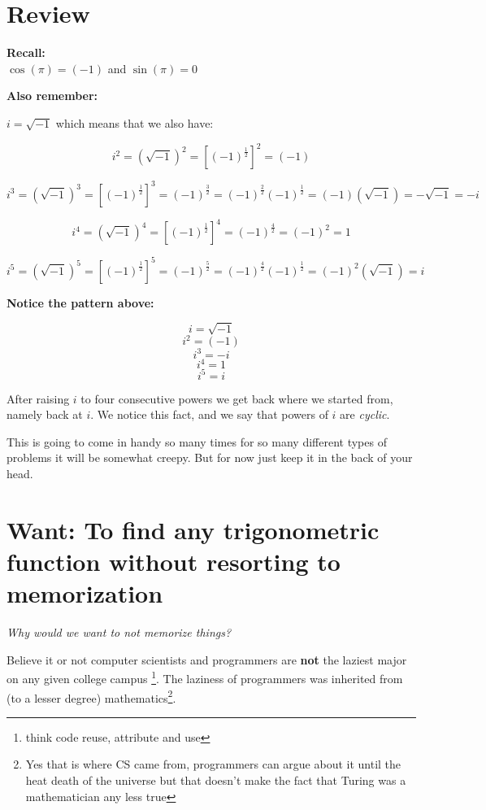 \documentclass[10pt]{article}
\theoremstyle{definition}
\theoremstyle{plain}
\theoremstyle{remark}
\newcommand{\irt}{i = \sqrt{-1}}
\begin{document}
\section*{Review}

\textbf{Recall:} \\

$\cos{(\pi)} = (-1)$ and $\sin{(\pi)} = 0$

\textbf{Also remember:}

$\irt$ which means that we also have:

\[ i^{2} = (\sqrt{-1})^{2} = [(-1)^{\frac{1}{2}}]^{2} = (-1) \]

\[ i^{3} = (\sqrt{-1})^{3} = [(-1)^{\frac{1}{2}}]^{3} = (-1)^{\frac{3}{2}} = (-1)^{\frac{2}{2}}(-1)^{\frac{1}{2}} = (-1)(\sqrt{-1}) = -\sqrt{-1} = -i \]

\[ i^{4} = (\sqrt{-1})^{4} = [(-1)^{\frac{1}{2}}]^{4} = (-1)^{\frac{4}{2}} = (-1)^{2} = 1 \]

\[ i^{5} = (\sqrt{-1})^{5} = [(-1)^{\frac{1}{2}}]^{5} = (-1)^{\frac{5}{2}} = (-1)^{\frac{4}{2}}(-1)^{\frac{1}{2}} = (-1)^{2}(\sqrt{-1}) = i \]

\textbf{Notice the pattern above:} 

\[ i = \sqrt{-1} \]
\[ i^{2} = (-1) \]
\[ i^{3} = -i \]
\[ i^{4} = 1 \]
\[ i^5 = i \]

After raising $i$ to four consecutive powers we get back where we started from, namely back at $i$. We notice this fact, and we say that powers of $i$ are \textit{cyclic}.

This is going to come in handy so many times for so many different types of problems it will be somewhat creepy. But for now just keep it in the back of your head.

\section*{Want: To find any trigonometric function without resorting to memorization}

\textit{Why would we want to not memorize things?}

Believe it or not computer scientists and programmers are \textbf{not} the laziest major on any given college campus \footnote{think code reuse, attribute and use}. The laziness of programmers was inherited from (to a lesser degree) mathematics\footnote{Yes that is where CS came from, programmers can argue about it until the heat death of the universe but that doesn't make the fact that Turing was a mathematician any less true}. 
\end{document}
